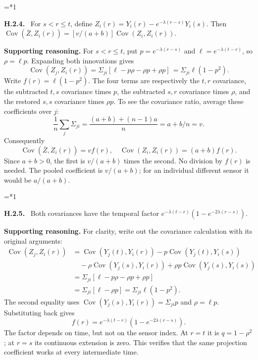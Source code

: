 \documentclass[12pt,letterpaper]{article}
\newcommand{\Cov}{\operatorname{Cov}}
\newenvironment{proofstep}[2]{%
  \begin{list}{}{\leftmargin=\dimexpr 0.17in*#2\relax%
  \setlength{\rightmargin}{0pt}\setlength{\topsep}{5pt}\setlength{\parsep}{2pt}}%
  \item[]\textbf{\textcolor{ink}{#1.}}\ }{\end{list}}
\begin{document}
\begin{proofstep}{H.2.4}{1}
\label{step:H.2.4}
For $s<r\le t$, define $Z_i(r)=Y_i(r)-e^{-\lambda(r-s)}Y_i(s)$. Then $\Cov(\bar Z,Z_i(r))=[v/(a+b)]\Cov(Z_i,Z_i(r))$.

\textbf{Supporting reasoning.}
For $s<r\le t$, put $p=e^{-\lambda(r-s)}$ and $\ell=e^{-\lambda(t-r)}$, so $\rho=\ell p$. Expanding both innovations gives
\[
\Cov(Z_j,Z_i(r))=\Sigma_{ji}[\ell-p\rho-\rho p+\rho p]\,=\Sigma_{ji}\ell(1-p^2).
\]
Write $f(r)=\ell(1-p^2)$. The four terms are respectively the $t,r$ covariance, the subtracted $t,s$ covariance times $p$, the subtracted $s,r$ covariance times $\rho$, and the restored $s,s$ covariance times $\rho p$. To see the covariance ratio, average these coefficients over $j$:
\[
\frac1n\sum_j\Sigma_{ji}=\frac{(a+b)+(n-1)a}{n}=a+b/n=v.
\]
Consequently
\[
\Cov(\bar Z,Z_i(r))=vf(r),\quad
\Cov(Z_i,Z_i(r))=(a+b)f(r).
\]
Since $a+b>0$, the first is $v/(a+b)$ times the second. No division by $f(r)$ is needed. The pooled coefficient is $v/(a+b)$; for an individual different sensor it would be $a/(a+b)$.
\par{}
\end{proofstep}

\begin{proofstep}{H.2.5}{1}
\label{step:H.2.5}
Both covariances have the temporal factor $e^{-\lambda(t-r)}(1-e^{-2\lambda(r-s)})$.

\textbf{Supporting reasoning.}
For clarity, write out the covariance calculation with its original arguments:
\begin{align*}
\Cov(Z_j,Z_i(r))
&=\Cov(Y_j(t),Y_i(r))-p\Cov(Y_j(t),Y_i(s))\\
&\quad-\rho\Cov(Y_j(s),Y_i(r))+\rho p\Cov(Y_j(s),Y_i(s))\\
&=\Sigma_{ji}[\ell-p\rho-\rho p+\rho p]\\
&=\Sigma_{ji}[\ell-\rho p]
=\Sigma_{ji}\ell(1-p^2).
\end{align*}
The second equality uses $\Cov(Y_j(s),Y_i(r))=\Sigma_{ji}p$ and $\rho=\ell p$. Substituting back gives
\[
f(r)=e^{-\lambda(t-r)}(1-e^{-2\lambda(r-s)}).
\]
The factor depends on time, but not on the sensor index. At $r=t$ it is $q=1-\rho^2$; at $r=s$ its continuous extension is zero. This verifies that the same projection coefficient works at every intermediate time.
\par{}
\end{proofstep}
\end{document}
